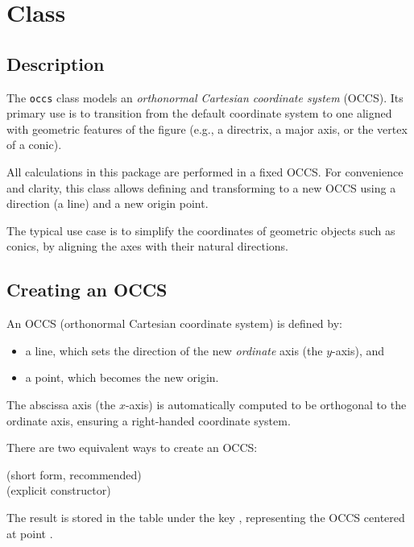 \newpage
\section{Class }
\label{sec:orthonormal_cartesian_coordinate_system}

\subsection{Description}
The \texttt{occs} class models an \emph{orthonormal Cartesian coordinate system} (OCCS). Its primary use is to transition from the default coordinate system to one aligned with geometric features of the figure (e.g., a directrix, a major axis, or the vertex of a conic).

All calculations in this package are performed in a fixed OCCS. For convenience and clarity, this class allows defining and transforming to a new OCCS using a direction (a line) and a new origin point.

\medskip
\noindent
The typical use case is to simplify the coordinates of geometric objects such as conics, by aligning the axes with their natural directions.

\subsection{Creating an OCCS}

An OCCS (orthonormal Cartesian coordinate system) is defined by:
\begin{itemize}
  \item a line, which sets the direction of the new \emph{ordinate} axis (the $y$-axis), and
  \item a point, which becomes the new origin.
\end{itemize}

The abscissa axis (the $x$-axis) is automatically computed to be orthogonal to the ordinate axis, ensuring a right-handed coordinate system.

\medskip
\noindent
There are two equivalent ways to create an OCCS:

\begin{mybox}
   \hfill (short form, recommended)
  \\
   \hfill (explicit constructor)
\end{mybox}

The result is stored in the table  under the key , representing the OCCS centered at point .

